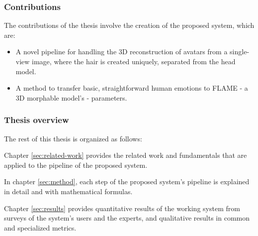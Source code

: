 \subsubsection{Contributions}

The contributions of the thesis involve the creation of the proposed system, which are:

\begin{itemize}
  \item A novel pipeline for handling the 3D reconstruction of avatars from a single-view image, where the hair is created uniquely, separated from the head model.
  \item A method to transfer basic, straightforward human emotions to FLAME - a 3D morphable model's - parameters.
\end{itemize}

\subsubsection{Thesis overview}

The rest of this thesis is organized as follows:

Chapter \ref{sec:related-work} provides the related work and fundamentals that are applied to the pipeline of the proposed system.

In chapter \ref{sec:method}, each step of the proposed system's pipeline is explained in detail and with mathematical formulas.

Chapter \ref{sec:results} provides quantitative results of the working system from surveys of the system's users and the experts, and qualitative results in common and specialized metrics.